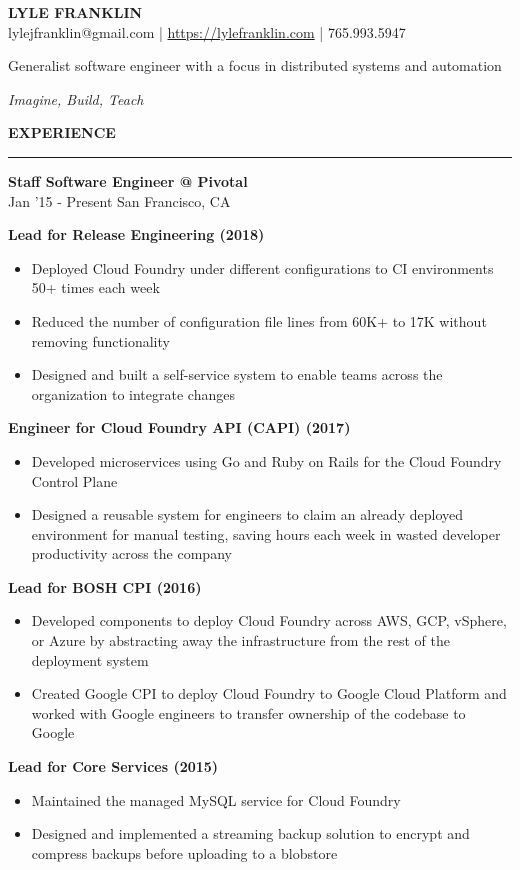 \documentclass[a4paper,10pt]{article}
\newcommand{\name}[1]{\textbf{\huge{#1}}}
\newcommand{\header}[1]
{
\vspace{0.10in}
{\Large \textbf {\uppercase{#1}}}
\vspace{0.05in}
\hrule
\vspace{0.15in}
}
\newcommand{\spacer}{\vspace*{1\baselineskip}}
\newenvironment{details}
{\begin{itemize}[label=\scalebox{.5}{\ding{117}},leftmargin=0.15in]}
{\end{itemize}}
\begin{document}
\name{LYLE FRANKLIN}\\
\indent
lylejfranklin@gmail.com | \url{https://lylefranklin.com} | 765.993.5947

\spacer

Generalist software engineer with a focus in distributed systems and automation

\textit{Imagine, Build, Teach}

\begin{minipage}[t]{0.5\textwidth}
\header{Experience}
{\fontsize{14}{16}\selectfont \textbf{Staff Software Engineer @ Pivotal}}\\
Jan '15 - Present \textbar\enspace San Francisco, CA

\textbf{Lead for Release Engineering (2018)}
\begin{details}
  \item Deployed Cloud Foundry under different configurations to CI environments 50+ times each week
  \item Reduced the number of configuration file lines from 60K+ to 17K without removing functionality
  \item Designed and built a self-service system to enable teams across the organization to integrate changes
\end{details}
\textbf{Engineer for Cloud Foundry API (CAPI) (2017)}
\begin{details}
  \item Developed microservices using Go and Ruby on Rails for the Cloud Foundry Control Plane
  \item Designed a reusable system for engineers to claim an already deployed environment for manual testing, saving hours each week in wasted developer productivity across the company
\end{details}
\textbf{Lead for BOSH CPI (2016)}
\begin{details}
  \item Developed components to deploy Cloud Foundry across AWS, GCP, vSphere, or Azure by abstracting away the infrastructure from the rest of the deployment system 
  \item Created Google CPI to deploy Cloud Foundry to Google Cloud Platform and worked with Google engineers to transfer ownership of the codebase to Google
\end{details}
\textbf{Lead for Core Services (2015)}
\begin{details}
  \item Maintained the managed MySQL service for Cloud Foundry
  \item Designed and implemented a streaming backup solution to encrypt and compress backups before uploading to a blobstore
\end{details}


\end{minipage}
\end{document}
